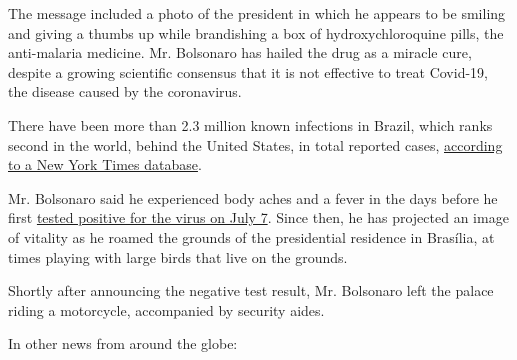 The message included a photo of the president in which he appears to be
smiling and giving a thumbs up while brandishing a box of
hydroxychloroquine pills, the anti-malaria medicine. Mr. Bolsonaro has
hailed the drug as a miracle cure, despite a growing scientific
consensus that it is not effective to treat Covid-19, the disease caused
by the coronavirus.

There have been more than 2.3 million known infections in Brazil, which
ranks second in the world, behind the United States, in total reported
cases,
\href{https://www.nytimes3xbfgragh.onion/interactive/2020/world/coronavirus-maps.html\#countries}{according
to a New York Times database}.

Mr. Bolsonaro said he experienced body aches and a fever in the days
before he first
\href{https://www.nytimes3xbfgragh.onion/2020/07/07/world/americas/brazil-bolsonaro-coronavirus.html}{tested
positive for the virus on July 7}. Since then, he has projected an image
of vitality as he roamed the grounds of the presidential residence in
Brasília, at times playing with large birds that live on the grounds.

Shortly after announcing the negative test result, Mr. Bolsonaro left
the palace riding a motorcycle, accompanied by security aides.

In other news from around the globe:

